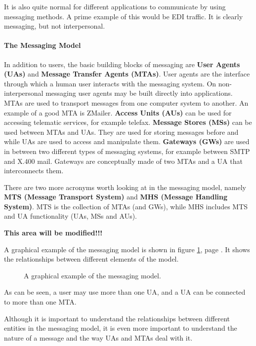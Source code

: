 It is also quite normal for different applications to communicate by using
messaging methods.
A prime example of this would be EDI traffic. It is clearly messaging,
but not interpersonal.




\paragraph{The Messaging Model}

In addition to users, the basic building blocks of messaging are
{\bf User Agents (UAs)} and {\bf Message Transfer Agents (MTAs)}.
User agents are the interface through which a human user interacts with
the messaging system.
On non-interpersonal messaging user agents may be built directly into
applications.
MTAs are used to transport messages from one computer system to another.
An example of a good MTA is ZMailer. 
{\bf Access Units (AUs)} can be used for accessing telematic services,
for example telefax. 
{\bf Message Stores (MSs)} can be used between MTAs and UAs.
They are used for storing messages before and while UAs are used
to access and manipulate them.
{\bf Gateways (GWs)} are used in between two different types
of messaging systems, for example between SMTP and X.400 mail.
Gateways are conceptually made of two MTAs and a UA that interconnects them.

There are two more acronyms worth looking at in the messaging model,
namely {\bf MTS (Message Transport System)} and
{\bf MHS (Message Handling System)}.
MTS is the collection of MTAs (and GWs),
while MHS includes MTS and UA functionality (UAs, MSs and AUs).

{\bf This area will be modified!!!}



A graphical example of the messaging model is shown in figure 
\ref{msg_modl}, page \pageref{msg_modl}. It 
shows the relationships between different elements of the model.

\begin{figure}[tbp]
\centerline{}
\caption{\label{msg_modl}A graphical example of the messaging model.}
\end{figure}








As can be seen, a user may use more than one UA, and a UA can be connected 
to more than one MTA.

Although it is important to understand the relationships between different 
entities in the messaging model, it is even more important to understand the 
nature of a message and the way UAs and MTAs deal with it.


